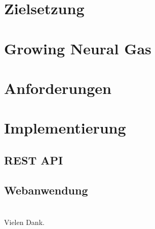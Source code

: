 \section{Zielsetzung}

\section{Growing Neural Gas}

\section{Anforderungen}

\section{Implementierung}
\subsection*{REST API}

\subsection*{Webanwendung}


%
\section*{}
\begin{frame}
	\begin{center}
        \Huge{Vielen Dank.}
	\end{center}
\end{frame}


